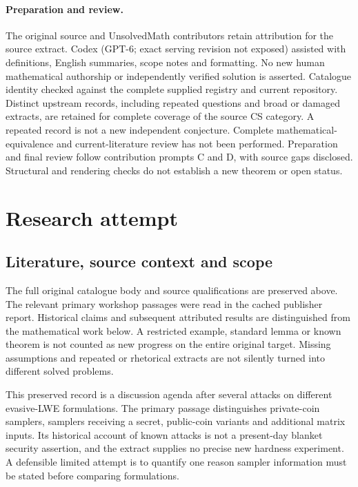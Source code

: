 \documentclass[11pt]{article}
\begin{document}
\paragraph{Preparation and review.}
The original source and UnsolvedMath contributors retain attribution for the source extract. Codex (GPT-6; exact serving revision not exposed) assisted with definitions, English summaries, scope notes and formatting. No new human mathematical authorship or independently verified solution is asserted. Catalogue identity checked against the complete supplied registry and current repository. Distinct upstream records, including repeated questions and broad or damaged extracts, are retained for complete coverage of the source CS category. A repeated record is not a new independent conjecture. Complete mathematical-equivalence and current-literature review has not been performed. Preparation and final review follow contribution prompts C and D, with source gaps disclosed. Structural and rendering checks do not establish a new theorem or open status.
\label{end:statement}

\section{Research attempt}
\subsection{Literature, source context and scope}
The full original catalogue body and source qualifications are preserved above. The relevant primary workshop passages were read in the cached publisher report. Historical claims and subsequent attributed results are distinguished from the mathematical work below. A restricted example, standard lemma or known theorem is not counted as new progress on the entire original target. Missing assumptions and repeated or rhetorical extracts are not silently turned into different solved problems.

This preserved record is a discussion agenda after several attacks on different evasive-LWE formulations. The primary passage distinguishes private-coin samplers, samplers receiving a secret, public-coin variants and additional matrix inputs. Its historical account of known attacks is not a present-day blanket security assertion, and the extract supplies no precise new hardness experiment. A defensible limited attempt is to quantify one reason sampler information must be stated before comparing formulations.
\end{document}
